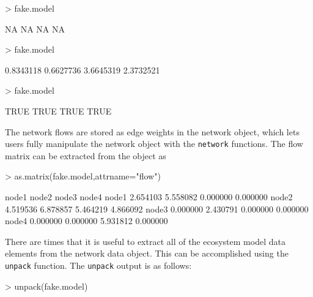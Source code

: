 \documentclass[article]{jss}
\begin{document}
\begin{Schunk}
\begin{Sinput}
> fake.model%
\end{Sinput}
\begin{Soutput}
[1] NA NA NA NA
\end{Soutput}
\begin{Sinput}
> fake.model%
\end{Sinput}
\begin{Soutput}
[1] 0.8343118 0.6627736 3.6645319 2.3732521
\end{Soutput}
\begin{Sinput}
> fake.model%
\end{Sinput}
\begin{Soutput}
[1] TRUE TRUE TRUE TRUE
\end{Soutput}
\end{Schunk}

The network flows are stored as edge weights in the network object,
which lets users fully manipulate the network object with the
\texttt{network} functions.  The flow matrix can be extracted from the
object as

\begin{Schunk}
\begin{Sinput}
> as.matrix(fake.model,attrname="flow")
\end{Sinput}
\begin{Soutput}
         node1    node2    node3    node4
node1 2.654103 5.558082 0.000000 0.000000
node2 4.519536 6.878857 5.464219 4.866092
node3 0.000000 2.430791 0.000000 0.000000
node4 0.000000 0.000000 5.931812 0.000000
\end{Soutput}
\end{Schunk}

There are times that it is useful to extract all of the ecosystem
model data elements from the network data object.  This can be
accomplished using the \texttt{unpack} function. The \texttt{unpack}
output is as follows:

\begin{Schunk}
\begin{Sinput}
> unpack(fake.model)
\end{Sinput}
\end{Schunk}
\end{document}
